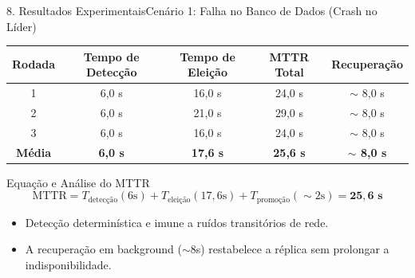 \documentclass[aspectratio=169,10pt]{beamer}
\begin{document}
\begin{frame}{8. Resultados Experimentais}{Cenário 1: Falha no Banco de Dados (Crash no Líder)}
  \begin{table}
    \centering
    \small
    \begin{tabular}{ccccc}
      \toprule
      \textbf{Rodada} & \textbf{Tempo de Detecção} & \textbf{Tempo de Eleição} & \textbf{MTTR Total} & \textbf{Recuperação} \\
      \midrule
      1 & 6,0 s & 16,0 s & 24,0 s & $\sim$ 8,0 s \\
      2 & 6,0 s & 21,0 s & 29,0 s & $\sim$ 8,0 s \\
      3 & 6,0 s & 16,0 s & 24,0 s & $\sim$ 8,0 s \\
      \midrule
      \textbf{Média} & \textbf{6,0 s} & \textbf{17,6 s} & \textbf{25,6 s} & \textbf{$\sim$ 8,0 s} \\
      \bottomrule
    \end{tabular}
  \end{table}
  \vspace{-0.5em}
  \begin{block}{Equação e Análise do MTTR}
    \[ \text{MTTR} = T_{\text{detecção}} (6\text{s}) + T_{\text{eleição}} (17,6\text{s}) + T_{\text{promoção}} (\sim 2\text{s}) = \mathbf{25,6\text{ s}} \]
    \begin{itemize}
      \item Detecção determinística e imune a ruídos transitórios de rede.
      \item A recuperação em background ($\sim 8$s) restabelece a réplica sem prolongar a indisponibilidade.
    \end{itemize}
  \end{block}
\end{frame}
\end{document}
